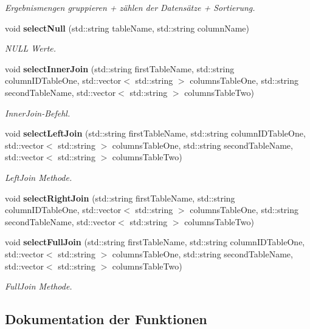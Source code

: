 \begin{DoxyCompactItemize}
\begin{DoxyCompactList}\small\item\em Ergebnismengen gruppieren + zählen der Datensätze + Sortierung. \end{DoxyCompactList}\item 
void \textbf{ select\+Null} (std\+::string table\+Name, std\+::string column\+Name)
\begin{DoxyCompactList}\small\item\em N\+U\+LL Werte. \end{DoxyCompactList}\item 
void \textbf{ select\+Inner\+Join} (std\+::string first\+Table\+Name, std\+::string column\+I\+D\+Table\+One, std\+::vector$<$ std\+::string $>$ columns\+Table\+One, std\+::string second\+Table\+Name, std\+::vector$<$ std\+::string $>$ columns\+Table\+Two)
\begin{DoxyCompactList}\small\item\em Inner\+Join-\/\+Befehl. \end{DoxyCompactList}\item 
void \textbf{ select\+Left\+Join} (std\+::string first\+Table\+Name, std\+::string column\+I\+D\+Table\+One, std\+::vector$<$ std\+::string $>$ columns\+Table\+One, std\+::string second\+Table\+Name, std\+::vector$<$ std\+::string $>$ columns\+Table\+Two)
\begin{DoxyCompactList}\small\item\em Left\+Join Methode. \end{DoxyCompactList}\item 
void \textbf{ select\+Right\+Join} (std\+::string first\+Table\+Name, std\+::string column\+I\+D\+Table\+One, std\+::vector$<$ std\+::string $>$ columns\+Table\+One, std\+::string second\+Table\+Name, std\+::vector$<$ std\+::string $>$ columns\+Table\+Two)
\item 
void \textbf{ select\+Full\+Join} (std\+::string first\+Table\+Name, std\+::string column\+I\+D\+Table\+One, std\+::vector$<$ std\+::string $>$ columns\+Table\+One, std\+::string second\+Table\+Name, std\+::vector$<$ std\+::string $>$ columns\+Table\+Two)
\begin{DoxyCompactList}\small\item\em Full\+Join Methode. \end{DoxyCompactList}\end{DoxyCompactItemize}


\subsection{Dokumentation der Funktionen}
\mbox{\label{selection_request_8cpp_a1909c1b8666cf6e3d31a014c9a9ad2d7}} 

